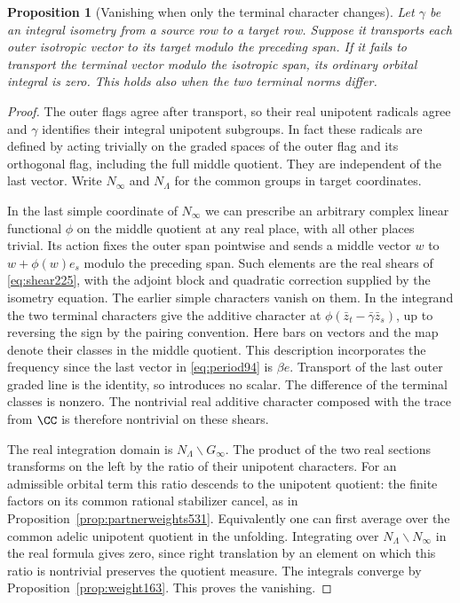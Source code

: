 \documentclass[a4paper,11pt]{article}
\newtheorem{proposition}{Proposition}[section]
\theoremstyle{definition}
\theoremstyle{remark}
\numberwithin{equation}{section}
\begin{document}
\begin{proposition}[Vanishing when only the terminal character changes]
\leavevmode\label{prop:terminalvanishing553}
Let \(\gamma\) be an integral isometry from a source row to
a target row. Suppose it transports each outer isotropic
vector to its target modulo the preceding span. If it fails
to transport the terminal vector modulo the isotropic span,
its ordinary orbital integral is zero. This holds also when
the two terminal norms differ.
\end{proposition}
\begin{proof}
The outer flags agree after transport, so their real unipotent
radicals agree and \(\gamma\) identifies their integral
unipotent subgroups. In fact these radicals are defined by
acting trivially on the graded spaces of the outer flag and
its orthogonal flag, including the full middle quotient.
They are independent of the last vector. Write \(N_\infty\)
and \(N_\Lambda\) for the common groups in target coordinates.

In the last simple coordinate of \(N_\infty\) we can prescribe
an arbitrary complex linear functional \(\phi\) on the
middle quotient at any real place, with all other places
trivial. Its action fixes the outer span pointwise and sends
a middle vector \(w\) to \(w+\phi(w)e_s\) modulo the preceding
span. Such elements are the real shears of
\eqref{eq:shear225}, with the adjoint block and quadratic
correction supplied by the isometry equation. The earlier
simple characters vanish on them. In the integrand the two
terminal characters give the additive character at
\(\phi(\bar z_t-\bar\gamma\bar z_s)\), up to reversing the sign
by the pairing convention. Here bars on vectors and the map
denote their classes in the middle quotient. This description
incorporates the frequency since the last vector in
\eqref{eq:period94} is \(\beta e\). Transport of the last
outer graded line is the identity, so introduces no scalar.
The difference of the terminal classes is nonzero. The
nontrivial real additive character composed with the trace
from \(\CC\) is therefore nontrivial on these shears.

The real integration domain is \(N_\Lambda\backslash G_\infty\).
The product of the two real sections transforms on the left
by the ratio of their unipotent characters. For an admissible
orbital term this ratio descends to the unipotent quotient:
the finite factors on its common rational stabilizer cancel,
as in Proposition~\ref{prop:partnerweights531}. Equivalently
one can first average over the common adelic unipotent
quotient in the unfolding. Integrating over
\(N_\Lambda\backslash N_\infty\) in the real formula gives
zero, since right translation by an element on which this
ratio is nontrivial preserves the quotient measure. The
integrals converge by Proposition~\ref{prop:weight163}.
This proves the vanishing.
\end{proof}
\end{document}
